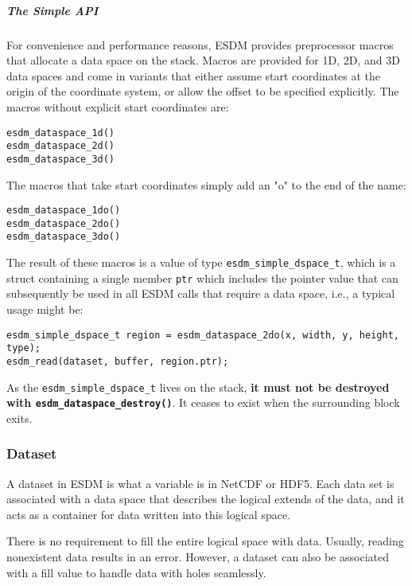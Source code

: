 \subparagraph{The Simple API}

For convenience and performance reasons, ESDM provides preprocessor macros that allocate a data space on the stack. 
Macros are provided for 1D, 2D, and 3D data spaces and come in variants that either assume start coordinates at the origin of the coordinate system, or
allow the offset to be specified explicitly. 
The macros without explicit start coordinates are:

\begin{lstlisting}
esdm_dataspace_1d()
esdm_dataspace_2d()
esdm_dataspace_3d()
\end{lstlisting}

The macros that take start coordinates simply add an "o" to the end of
the name:

\begin{lstlisting}
esdm_dataspace_1do()
esdm_dataspace_2do()
esdm_dataspace_3do()
\end{lstlisting}

The result of these macros is a value of type \lstinline|esdm_simple_dspace_t|, which is a struct containing a single member \lstinline|ptr| which includes the pointer value that can subsequently be used in all ESDM calls that require a data space, i.e., a typical usage might be:

\begin{lstlisting}
esdm_simple_dspace_t region = esdm_dataspace_2do(x, width, y, height, type);
esdm_read(dataset, buffer, region.ptr);
\end{lstlisting}

As the \lstinline|esdm_simple_dspace_t| lives on the stack, \textbf{it must not be destroyed with \lstinline|esdm_dataspace_destroy()|}. 
It ceases to exist when the surrounding block exits.

\subsubsection{Dataset}
\label{sec:user-guides:dataset}

A dataset in ESDM is what a variable is in NetCDF or HDF5. 
Each data set is associated with a data space that describes the logical extends of the data, and it acts as a container for data written into this logical space.

There is no requirement to fill the entire logical space with data. 
Usually, reading nonexistent data results in an error. 
However, a dataset can also be associated with a fill value to handle data with holes seamlessly.

